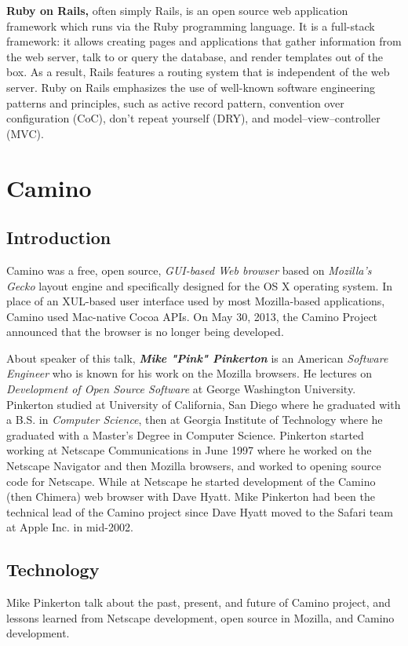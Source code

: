 \documentclass[11pt]{article}
\begin{document}
\textbf{Ruby on Rails,} often simply Rails, is an open source web application framework which runs via the Ruby programming language. It is a full-stack framework: it allows creating pages and applications that gather information from the web server, talk to or query the database, and render templates out of the box. As a result, Rails features a routing system that is independent of the web server. Ruby on Rails emphasizes the use of well-known software engineering patterns and principles, such as active record pattern, convention over configuration (CoC), don't repeat yourself (DRY), and model–view–controller (MVC).

\newpage


\section{Camino}

\subsection{Introduction}
Camino was a free, open source, \emph{GUI-based Web browser} based on \emph{Mozilla's Gecko }layout engine and specifically designed for the OS X operating system. In place of an XUL-based user interface used by most Mozilla-based applications, Camino used Mac-native Cocoa APIs. On May 30, 2013, the Camino Project announced that the browser is no longer being developed.

About speaker of this talk, \textbf{\emph{Mike "Pink" Pinkerton}} is an American \emph{Software Engineer} who is known for his work on the Mozilla browsers. He lectures on \emph{Development of Open Source Software} at George Washington University. Pinkerton studied at University of California, San Diego where he graduated with a B.S. in \emph{Computer Science}, then at Georgia Institute of Technology where he graduated with a Master's Degree in Computer Science. Pinkerton started working at Netscape Communications in June 1997 where he worked on the Netscape Navigator and then Mozilla browsers, and worked to opening source code for Netscape. While at Netscape he started development of the Camino (then Chimera) web browser with Dave Hyatt.  Mike Pinkerton had been the technical lead of the Camino project since Dave Hyatt moved to the Safari team at Apple Inc. in mid-2002.

\subsection{Technology}
Mike Pinkerton talk about the past, present, and future of Camino project, and lessons learned from Netscape development, open source in Mozilla, and Camino development.
\end{document}
